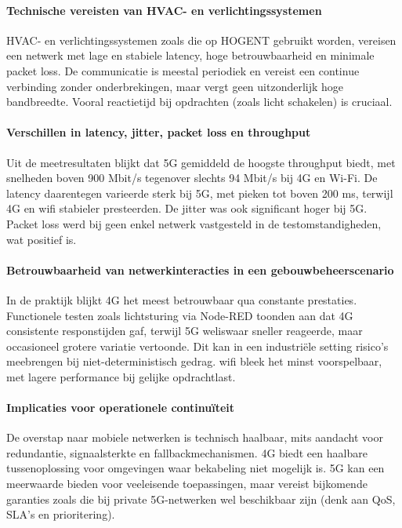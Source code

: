 \paragraph{Technische vereisten van HVAC- en verlichtingssystemen}HVAC- en verlichtingssystemen zoals die op HOGENT gebruikt worden, vereisen een netwerk met lage en stabiele latency, hoge betrouwbaarheid en minimale packet loss. De communicatie is meestal periodiek en vereist een continue verbinding zonder onderbrekingen, maar vergt geen uitzonderlijk hoge bandbreedte. Vooral reactietijd bij opdrachten (zoals licht schakelen) is cruciaal.

\paragraph{Verschillen in latency, jitter, packet loss en throughput}Uit de meetresultaten blijkt dat 5G gemiddeld de hoogste throughput biedt, met snelheden boven 900 Mbit/s tegenover slechts 94 Mbit/s bij 4G en Wi-Fi. De latency daarentegen varieerde sterk bij 5G, met pieken tot boven 200 ms, terwijl 4G en wifi stabieler presteerden. De jitter was ook significant hoger bij 5G. Packet loss werd bij geen enkel netwerk vastgesteld in de testomstandigheden, wat positief is.

\paragraph{Betrouwbaarheid van netwerkinteracties in een gebouwbeheerscenario}In de praktijk blijkt 4G het meest betrouwbaar qua constante prestaties. Functionele testen zoals lichtsturing via Node-RED toonden aan dat 4G consistente responstijden gaf, terwijl 5G weliswaar sneller reageerde, maar occasioneel grotere variatie vertoonde. Dit kan in een industriële setting risico’s meebrengen bij niet-deterministisch gedrag. wifi bleek het minst voorspelbaar, met lagere performance bij gelijke opdrachtlast.

\paragraph{Implicaties voor operationele continuïteit}De overstap naar mobiele netwerken is technisch haalbaar, mits aandacht voor redundantie, signaalsterkte en fallbackmechanismen. 4G biedt een haalbare tussenoplossing voor omgevingen waar bekabeling niet mogelijk is. 5G kan een meerwaarde bieden voor veeleisende toepassingen, maar vereist bijkomende garanties zoals die bij private 5G-netwerken wel beschikbaar zijn (denk aan QoS, SLA’s en prioritering).


